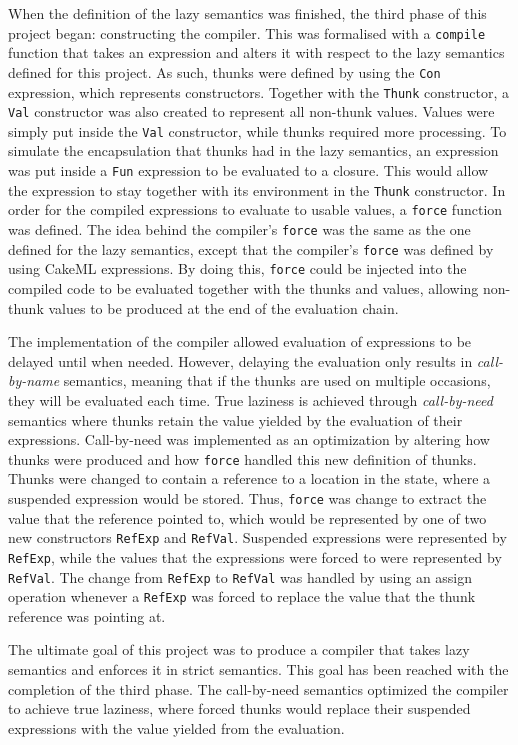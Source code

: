 When the definition of the lazy semantics was finished, the third phase of this
project began: constructing the compiler. This was formalised with a
\texttt{compile} function that takes an expression and alters it with respect to
the lazy semantics defined for this project. As such, thunks were defined by
using the \texttt{Con} expression, which represents constructors. Together with
the \texttt{Thunk} constructor, a \texttt{Val} constructor was also created to
represent all non-thunk values. Values were simply put inside the \texttt{Val}
constructor, while thunks required more processing. To simulate the
encapsulation that thunks had in the lazy semantics, an expression was put
inside a \texttt{Fun} expression to be evaluated to a closure. This would allow the
expression to stay together with its environment in the \texttt{Thunk}
constructor. In order for the compiled expressions to evaluate to usable values,
a \texttt{force} function was defined. The idea behind the compiler's
\texttt{force} was the same as the one defined for the lazy semantics, except
that the compiler's \texttt{force} was defined by using CakeML expressions.
By doing this, \texttt{force} could be injected into the compiled code to be
evaluated together with the thunks and values, allowing non-thunk values to be
produced at the end of the evaluation chain.

The implementation of the compiler allowed evaluation of expressions to be
delayed until when needed. However, delaying the evaluation only results in
\textit{call-by-name} semantics, meaning that if the thunks are used on multiple
occasions, they will be evaluated each time. True laziness is achieved through
\textit{call-by-need} semantics where thunks retain the value yielded
by the evaluation of their expressions. Call-by-need was implemented as an optimization
by altering how thunks were produced and how \texttt{force} handled this new
definition of thunks. Thunks were changed to contain a reference to a location
in the state, where a suspended expression would be stored. Thus, \texttt{force}
was change to extract the value that the reference pointed to, which would be
represented by one of two new constructors \texttt{RefExp} and \texttt{RefVal}.
Suspended expressions were represented by \texttt{RefExp}, while the values that
the expressions were forced to were represented by \texttt{RefVal}. The change
from \texttt{RefExp} to \texttt{RefVal} was handled by using an assign operation
whenever a \texttt{RefExp} was forced to replace the value that the thunk
reference was pointing at.

The ultimate goal of this project was to produce a compiler that takes lazy
semantics and enforces it in strict semantics. This goal has
been reached with the completion of the third phase. The call-by-need semantics
optimized the compiler to achieve true laziness, where forced thunks
would replace their suspended expressions with the value yielded from
the evaluation.
